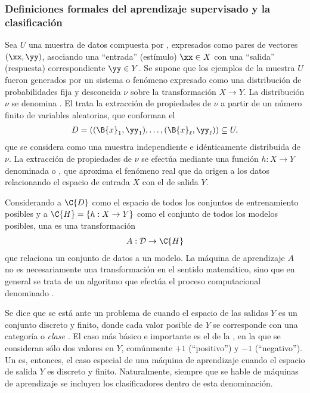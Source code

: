 %
\subsubsection{Definiciones formales del aprendizaje supervisado y la
  clasificación}
%
Sea $U$ una muestra de datos compuesta por , expresados
como pares de vectores $(\xx,\yy)$, asociando una ``entrada''
(estímulo) $\xx\in{}X$ con una ``salida'' (respuesta) correspondiente
$\yy\in{}Y$.
Se supone que los ejemplos de la muestra $U$ fueron generados por un
sistema o fenómeno expresado como una distribución de probabilidades
fija y desconcida $\nu$ sobre la transformación $X\rightarrow Y$.
La distribución $\nu$ se denomina .
El  trata la extracción de propiedades de
$\nu$ a partir de un número finito de variables aleatorias, que
conforman el 
%
\begin{align}
  D = \left((\B{x}_1,\yy_1),\ldots,(\B{x}_\ell,\yy_\ell)\right)
  \subseteq U,
\end{align}
%
que se considera como una muestra independiente e idénticamente
distribuida de $\nu$.
La extracción de propiedades de $\nu$ se efectúa mediante una función
$h:X\rightarrow{}Y$ denominada  o ,
que aproxima el fenómeno real que da origen a los datos relacionando
el espacio de entrada $X$ con el de salida $Y$.

Considerando a $\C{D}$ como el espacio de todos los conjuntos de
entrenamiento posibles y a $\C{H}=\{h:X\rightarrow Y\}$ como el
conjunto de todos los modelos posibles, una 
es una transformación
%
\begin{align}
  A:\mathcal{D}\rightarrow\C{H}
  \label{eq:maqaprendizaje}
\end{align}
%
que relaciona un conjunto de datos a un modelo.
La máquina de aprendizaje $A$ no es necesariamente una transformación
en el sentido matemático, sino que en general se trata de un algoritmo
que efectúa el proceso computacional denominado .

Se dice que se está ante un problema de  cuando el
espacio de las salidas $Y$ es un conjunto discreto y finito, donde
cada valor posible de $Y$ se corresponde con una categoría o
\emph{clase} \cite{russell}.
El caso más básico e importante es el de la ,
en la que se consideran sólo dos valores en $Y$, comúnmente $+1$
(``positivo'') y $-1$ (``negativo'').
Un  es, entonces, el caso especial de una máquina de
aprendizaje cuando el espacio de salida $Y$ es discreto y finito.
Naturalmente, siempre que se hable de máquinas de aprendizaje se
incluyen los clasificadores dentro de esta denominación.
